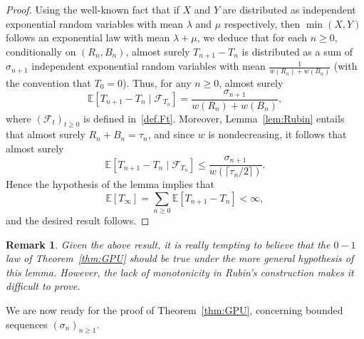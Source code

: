 \documentclass[11pt]{article}
\newtheorem {rem} {Remark} [section]
\newcommand{\1}{{\text{\Large $\mathfrak 1$}}}
\begin{document}
\begin{proof} Using the well-known fact that if $X$ and $Y$ are distributed as independent exponential random variables with mean $\lambda$ and $\mu$ respectively, then $\min(X,Y)$ follows an exponential law with mean $\lambda + \mu$, we deduce that for each $n\ge 0$, conditionally on $(R_n,B_n)$, almost surely $T_{n+1} - T_n$ is distributed as a sum of $\sigma_{n+1}$ independent exponential random variables with mean $\frac 1{w(R_n) + w(B_n)}$ (with the convention that $T_0 = 0$). Thus, for any $n\ge 0$, almost surely 
$$\mathbb E[T_{n+1}  - T_n \mid \mathcal F_{T_n}] = \frac {\sigma_{n+1}}{w(R_n) + w(B_n)},$$
where $(\mathcal F_t)_{t\ge 0}$ is defined in~\eqref{def.Ft}.  
Moreover,  Lemma~\ref{lem:Rubin} entails that almost surely $R_n + B_n = \tau_n$, and since $w$ is nondecreasing, it follows that almost surely 
$$\mathbb E[T_{n+1}  - T_n \mid \mathcal F_{T_n}] \le  \frac {\sigma_{n+1}}{w(\lceil \tau_n/2\rceil)}. $$ 
Hence the hypothesis of the lemma implies that 
$$\mathbb E[T_\infty] = \sum_{n\ge 0} \mathbb E[T_{n+1} - T_n] <\infty, $$
and the desired result follows. 
\end{proof} 

\begin{rem}\label{Rem:weak01} \emph{Given the above result, it is really tempting to believe that the $0-1$ law of Theorem~\ref{thm:GPU} should be true under the more general hypothesis of this lemma. 
However, the lack of monotonicity in Rubin's construction makes it difficult to prove.  }
\end{rem}

We are now ready for the proof of Theorem~\ref{thm:GPU}, concerning bounded sequences $(\sigma_n)_{n\ge 1}$.
 
\end{document}
